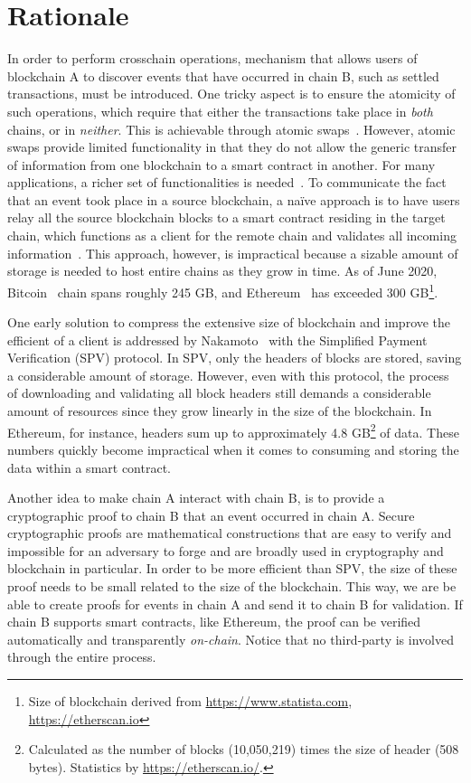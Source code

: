 \section{Rationale}

In order to perform crosschain operations, mechanism that allows users of
blockchain A to discover events that have occurred in chain B, such as settled
transactions, must be introduced. One tricky aspect is to ensure the atomicity
of such operations, which require that either the transactions take place in
\emph{both} chains, or in \emph{neither}.  This is achievable through atomic
swaps~\cite{tiernolan,herlihy2018atomic}.  However, atomic swaps provide
limited functionality in that they do not allow the generic transfer of
information from one blockchain to a smart contract in another. For many
applications, a richer set of functionalities is
needed~\cite{pow-sidechains,derivatives}.  To communicate the fact that an
event took place in a source blockchain, a na\"ive approach is to have users
relay all the source blockchain blocks to a smart contract residing in the
target chain, which functions as a client for the remote chain and validates
all incoming information~\cite{btcrelay}.  This approach, however, is
impractical because a sizable amount of storage is needed to host entire chains
as they grow in time. As of June 2020, Bitcoin~\cite{nakamoto} chain spans
roughly 245 GB, and Ethereum~\cite{wood, buterin} has exceeded 300
GB\footnote{Size of blockchain derived from \url{https://www.statista.com},
\url{https://etherscan.io}}.

One early solution to compress the extensive size of blockchain and improve the
efficient of a client is addressed by
Nakamoto~\cite{nakamoto} with the Simplified Payment Verification (SPV)
protocol. In SPV, only the headers of blocks are stored, saving a considerable
amount of storage.  However, even with this protocol, the process of
downloading and validating all block headers still demands a considerable
amount of resources since they grow linearly in the size of the blockchain.
In Ethereum, for instance, headers sum up to approximately 4.8
GB\footnote{Calculated as the number of blocks (10,050,219) times the size of
header (508 bytes). Statistics by \url{https://etherscan.io/}.} of data.
These numbers quickly become impractical when it comes to consuming and storing the
data within a smart contract.


Another idea to make chain A interact with chain B, is to provide a
cryptographic proof to chain B that an event occurred in chain A. Secure
cryptographic proofs are mathematical constructions that are easy to verify and
impossible for an adversary to forge and are broadly used in cryptography and
blockchain in particular. In order to be more efficient than SPV, the size of
these proof needs to be small related to the size of the blockchain. This way,
we are be able to create proofs for events in chain A and send it to chain B
for validation. If chain B supports smart contracts, like Ethereum, the proof
can be verified automatically and transparently \emph{on-chain}. Notice that no
third-party is involved through the entire process.

